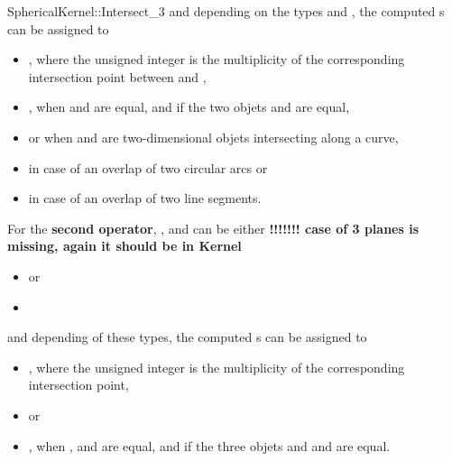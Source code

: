 \begin{ccRefFunctionObjectConcept}{SphericalKernel::Intersect_3}
and depending on the types  and , the computed 
s can be assigned to 
\begin{itemize}
\item {} ,
where the unsigned integer is the multiplicity of the corresponding
intersection point between  and ,
\item {} , when  and  are equal, and 
if the two objets  and  are equal,
\item {}  or  
when  and  are two-dimensional objets intersecting 
along a curve,
\item {}  in case of an overlap of 
two circular arcs or
\item {}  in case of an overlap of two 
line segments. 
\end{itemize} 

For the \textbf{second operator}, ,  and 
can be either
\textbf{!!!!!!! case of 3 planes is missing, again it should be in Kernel}

\begin{itemize}
\item {}  or
\item {} 
\end{itemize}

and depending of these types, the computed s can be 
assigned to 
\begin{itemize}
\item {} ,
where the unsigned integer is the multiplicity of the corresponding
intersection point,
\item {}  or
\item {} , when ,  and  
are equal, and if the three objets  and  and 
are equal.
\end{itemize} 

\end{ccRefFunctionObjectConcept}
